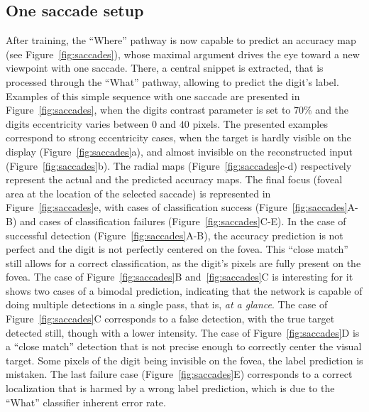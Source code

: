 \subsection{One saccade setup}
After training, the ``Where'' pathway is now capable to predict an accuracy map (see Figure~\ref{fig:saccades}), whose maximal argument drives the eye toward a new viewpoint with one saccade. There, a central snippet is extracted, that is processed through the ``What'' pathway, allowing to predict the digit's label. Examples of this simple sequence with one saccade are presented in Figure~\ref{fig:saccades}, when the digits contrast parameter is set to $70\%$ and the digits eccentricity varies between $0$ and $40$ pixels. The presented examples correspond to strong eccentricity cases, when the target is hardly visible on the display (Figure~\ref{fig:saccades}a), and almost invisible on the reconstructed input (Figure~\ref{fig:saccades}b). The radial maps (Figure~\ref{fig:saccades}c-d) respectively represent the actual and the predicted accuracy maps. The final focus (foveal area at the location of the selected saccade) is represented in Figure~\ref{fig:saccades}e, with cases of classification success (Figure~\ref{fig:saccades}A-B) and cases of classification failures (Figure~\ref{fig:saccades}C-E). In the case of successful detection (Figure~\ref{fig:saccades}A-B), the accuracy prediction is not perfect and the digit is not perfectly centered on the fovea. This ``close match'' still allows for a correct classification, as the digit's pixels are fully present on the fovea. The case of Figure~\ref{fig:saccades}B and~\ref{fig:saccades}C is interesting for it shows two cases of a bimodal prediction, indicating that the network is capable of doing multiple detections in a single pass, that is, \emph{at a glance}. The case of Figure~\ref{fig:saccades}C corresponds to a false detection, with the true target detected still, though with a lower intensity. The case of Figure~\ref{fig:saccades}D is a ``close match'' detection that is not precise enough to correctly center the visual target. Some pixels of the digit being invisible on the fovea, the label prediction is mistaken. The last failure case (Figure~\ref{fig:saccades}E) corresponds to a correct localization that is harmed by a wrong label prediction, which is due to the ``What'' classifier inherent error rate. %

